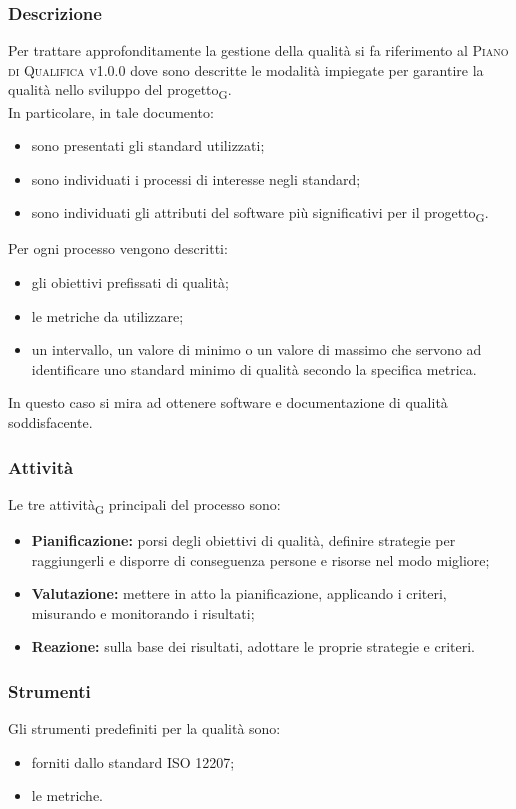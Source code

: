     \subsubsection{Descrizione}
    Per trattare approfonditamente la gestione della qualità si fa riferimento al \textsc{Piano di Qualifica v1.0.0} dove sono descritte le modalità impiegate per garantire la qualità nello sviluppo del progetto\textsubscript{G}.\\In particolare, in tale documento:
    \begin{itemize}
    	\item sono presentati gli standard utilizzati;
    	\item sono individuati i processi di interesse negli standard;
    	\item sono individuati gli attributi del software più significativi per il progetto\textsubscript{G}.
    \end{itemize}
	Per ogni processo vengono descritti:
	\begin{itemize}
		\item gli obiettivi prefissati di qualità;
		\item le metriche da utilizzare;
		\item un intervallo, un valore di minimo o un valore di massimo che servono ad identificare uno standard minimo di qualità secondo la specifica metrica.
	\end{itemize}
	In questo caso si mira ad ottenere software e documentazione di qualità soddisfacente.
    \subsubsection{Attività}
    Le tre attività\textsubscript{G} principali del processo sono:
    \begin{itemize}
    	\item \textbf{Pianificazione:} porsi degli obiettivi di qualità, definire strategie per raggiungerli e disporre di conseguenza persone e risorse nel modo migliore;
    	\item \textbf{Valutazione:} mettere in atto la pianificazione, applicando i criteri, misurando e monitorando i risultati;
    	\item \textbf{Reazione:} sulla base dei risultati, adottare le proprie strategie e criteri.
    \end{itemize}
	\subsubsection{Strumenti}
	Gli strumenti predefiniti per la qualità sono:
	\begin{itemize}
		\item forniti dallo standard ISO 12207;
		\item le metriche.
	\end{itemize}
